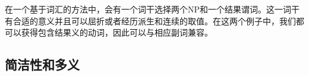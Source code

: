 \zl
%
    在一个基于词汇的方法中，会有一个词干选择两个NP和一个结果谓词。这一词干有合适的意义并且可以屈折或者经历派生和连续的取值。在这两个例子中，我们都可以获得包含结果义的动词，因此可以与相应副词兼容。

\subsection{简洁性和多义}
\label{polysemy-subsec}


